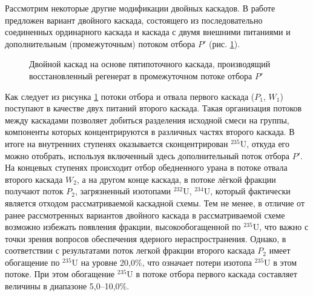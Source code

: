 Рассмотрим некоторые другие модификации двойных каскадов. В работе \cite{SposobIzotopnogoVosstanovleniyac} предложен вариант двойного каскада, состоящего из последовательно соединенных ординарного каскада и каскада с двумя внешними питаниями и дополнительным (промежуточным) потоком отбора $P'$ (рис. \ref{fig:double_crazy}).

\begin{figure}[ht]
  \caption{Двойной каскад на основе пятипоточного каскада, производящий восстановленный регенерат в промежуточном потоке отбора $P'$}\label{fig:double_crazy}
\end{figure}

Как следует из рисунка \ref{fig:double_crazy} потоки отбора и отвала первого каскада ($P_1$, $W_1$) поступают в качестве двух питаний второго каскада. Такая организация потоков между каскадами позволяет добиться разделения исходной смеси на группы, компоненты которых концентрируются в различных частях второго каскада. В итоге на внутренних ступенях оказывается сконцентрирован $^{235}$U, откуда его можно отобрать, используя включенный здесь дополнительный поток отбора $P'$. На концевых ступенях происходит отбор обедненного урана в потоке отвала второго каскада $W_2$, а на другом конце каскада, в потоке лёгкой фракции получают поток $P_2$, загрязненный изотопами $^{232}$U, $^{234}$U, который фактически является отходом рассматриваемой каскадной схемы. Тем не менее, в отличие от ранее рассмотренных вариантов двойного каскада в рассматриваемой схеме возможно избежать появления фракции, высокообогащенной по $^{235}$U, что важно с точки зрения вопросов обеспечения ядерного нераспространения. Однако, в соответствии с результатами \cite{SposobIzotopnogoVosstanovleniyac} поток легкой фракции второго каскада $P_2$ имеет обогащение по $^{235}$U на уровне 20,0\%, что означает потери изотопа $^{235}$U в этом потоке. При этом обогащение $^{235}$U в потоке отбора первого каскада составляет величины в диапазоне 5,0--10,0\%.
 
